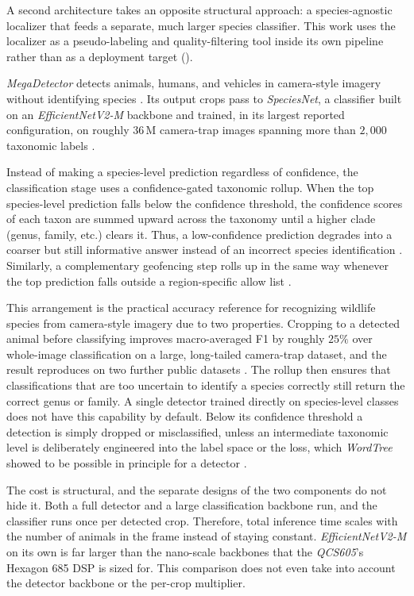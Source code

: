 A second architecture takes an opposite structural approach: a species-agnostic localizer that feeds a separate, much larger species classifier. This work uses the localizer as a pseudo-labeling and quality-filtering tool inside its own pipeline rather than as a deployment target ().

\textit{MegaDetector} detects animals, humans, and vehicles in camera-style imagery without identifying species \cite{beeryEfficientPipelineCamera2019}. Its output crops pass to \textit{SpeciesNet}, a classifier built on an \textit{EfficientNetV2-M} backbone \cite{gadotCropNotCrop2024a} and trained, in its largest reported configuration, on roughly $36\,\mathrm{M}$ camera-trap images spanning more than $2{,}000$ taxonomic labels \cite{gadotCropNotCrop2024}.

Instead of making a species-level prediction regardless of confidence, the classification stage uses a confidence-gated taxonomic rollup. When the top species-level prediction falls below the confidence threshold, the confidence scores of each taxon are summed upward across the taxonomy until a higher clade (genus, family, etc.) clears it. Thus, a low-confidence prediction degrades into a coarser but still informative answer instead of an incorrect species identification \cite{gadotCropNotCrop2024}. Similarly, a complementary geofencing step rolls up in the same way whenever the top prediction falls outside a region-specific allow list \cite{gadotCropNotCrop2024}.

This arrangement is the practical accuracy reference for recognizing wildlife species from camera-style imagery due to two properties. Cropping to a detected animal before classifying improves macro-averaged F1 by roughly $25\%$ over whole-image classification on a large, long-tailed camera-trap dataset, and the result reproduces on two further public datasets \cite{gadotCropNotCrop2024}. The rollup then ensures that classifications that are too uncertain to identify a species correctly still return the correct genus or family. A single detector trained directly on species-level classes does not have this capability by default. Below its confidence threshold a detection is simply dropped or misclassified, unless an intermediate taxonomic level is deliberately engineered into the label space or the loss, which \textit{WordTree} showed to be possible in principle for a detector \cite{redmonYOLO9000BetterFaster2017}.

The cost is structural, and the separate designs of the two components do not hide it. Both a full detector and a large classification backbone run, and the classifier runs once per detected crop. Therefore, total inference time scales with the number of animals in the frame instead of staying constant. \textit{EfficientNetV2-M} on its own is far larger than the nano-scale backbones that the \textit{QCS605}'s Hexagon 685 DSP is sized for. This comparison does not even take into account the detector backbone or the per-crop multiplier.

